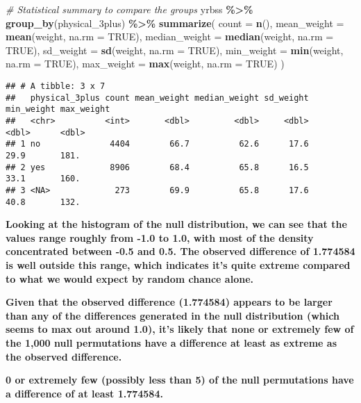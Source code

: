 \documentclass[
]{article}
\newenvironment{Shaded}{\begin{snugshade}}{\end{snugshade}}
\newcommand{\AttributeTok}[1]{\textcolor[rgb]{0.13,0.29,0.53}{#1}}
\newcommand{\CommentTok}[1]{\textcolor[rgb]{0.56,0.35,0.01}{\textit{#1}}}
\newcommand{\ConstantTok}[1]{\textcolor[rgb]{0.56,0.35,0.01}{#1}}
\newcommand{\FunctionTok}[1]{\textcolor[rgb]{0.13,0.29,0.53}{\textbf{#1}}}
\newcommand{\NormalTok}[1]{#1}
\newcommand{\SpecialCharTok}[1]{\textcolor[rgb]{0.81,0.36,0.00}{\textbf{#1}}}
\begin{document}
\begin{Shaded}
\begin{Highlighting}[]
\CommentTok{\# Statistical summary to compare the groups}
\NormalTok{yrbss }\SpecialCharTok{\%\textgreater{}\%}
  \FunctionTok{group\_by}\NormalTok{(physical\_3plus) }\SpecialCharTok{\%\textgreater{}\%}
  \FunctionTok{summarize}\NormalTok{(}
    \AttributeTok{count =} \FunctionTok{n}\NormalTok{(),}
    \AttributeTok{mean\_weight =} \FunctionTok{mean}\NormalTok{(weight, }\AttributeTok{na.rm =} \ConstantTok{TRUE}\NormalTok{),}
    \AttributeTok{median\_weight =} \FunctionTok{median}\NormalTok{(weight, }\AttributeTok{na.rm =} \ConstantTok{TRUE}\NormalTok{),}
    \AttributeTok{sd\_weight =} \FunctionTok{sd}\NormalTok{(weight, }\AttributeTok{na.rm =} \ConstantTok{TRUE}\NormalTok{),}
    \AttributeTok{min\_weight =} \FunctionTok{min}\NormalTok{(weight, }\AttributeTok{na.rm =} \ConstantTok{TRUE}\NormalTok{),}
    \AttributeTok{max\_weight =} \FunctionTok{max}\NormalTok{(weight, }\AttributeTok{na.rm =} \ConstantTok{TRUE}\NormalTok{)}
\NormalTok{  )}
\end{Highlighting}
\end{Shaded}

\begin{verbatim}
## # A tibble: 3 x 7
##   physical_3plus count mean_weight median_weight sd_weight min_weight max_weight
##   <chr>          <int>       <dbl>         <dbl>     <dbl>      <dbl>      <dbl>
## 1 no              4404        66.7          62.6      17.6       29.9       181.
## 2 yes             8906        68.4          65.8      16.5       33.1       160.
## 3 <NA>             273        69.9          65.8      17.6       40.8       132.
\end{verbatim}

\textbf{Looking at the histogram of the null distribution, we can see
that the values range roughly from -1.0 to 1.0, with most of the density
concentrated between -0.5 and 0.5. The observed difference of 1.774584
is well outside this range, which indicates it's quite extreme compared
to what we would expect by random chance alone.}

\textbf{Given that the observed difference (1.774584) appears to be
larger than any of the differences generated in the null distribution
(which seems to max out around 1.0), it's likely that none or extremely
few of the 1,000 null permutations have a difference at least as extreme
as the observed difference.}

\textbf{0 or extremely few (possibly less than 5) of the null
permutations have a difference of at least 1.774584.}
\end{document}
